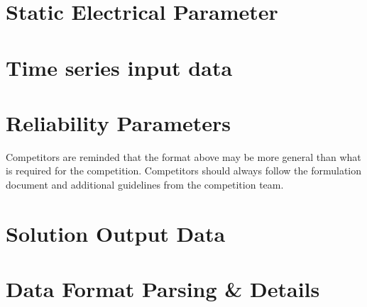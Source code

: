 \documentclass{article}
\begin{document}
\section{Static Electrical Parameter}
\label{sec:format_spec}



\section{Time series input data}


\section{Reliability Parameters}    


Competitors are reminded that the format above may be more general than
what is required for the competition.
Competitors should always
follow the formulation document and additional guidelines from the competition team.





\section{Solution Output Data}


\section{Data Format Parsing \& Details}

\end{document}
